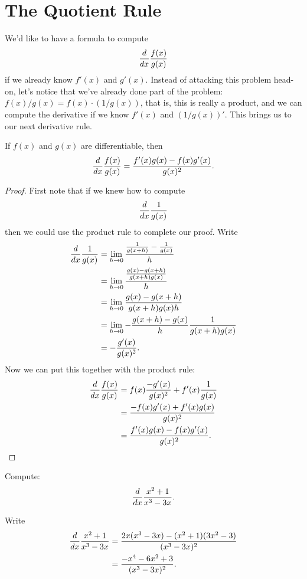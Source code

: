 \section{The Quotient Rule}


We'd like to have a formula to compute
\[
\frac{d}{dx} \frac{f(x)}{g(x)}
\]
if we already know $f'(x)$ and $g'(x)$. Instead of attacking this
problem head-on, let's notice that we've already done part of the
problem: $f(x)/g(x)= f(x)\cdot(1/g(x))$, that is, this is really a
product, and we can compute the derivative if we know $f'(x)$ and
$(1/g(x))'$. This brings us to our next derivative rule.

\begin{mainTheorem}\label{theorem:quotient-rule}
If $f(x)$ and $g(x)$ are differentiable, then
\[
\frac{d}{dx} \frac{f(x)}{g(x)} = \frac{f'(x)g(x)-f(x)g'(x)}{g(x)^2}.
\]
\end{mainTheorem}
\begin{proof}
First note that if we knew how to compute
\[
\frac{d}{dx} \frac{1}{g(x)}
\]
then we could use the product rule to complete our proof.  Write
\begin{align*}
\frac{d}{dx}\frac{1}{g(x)}&=\lim_{h\to0} \frac{\frac{1}{g(x+h)}-\frac{1}{g(x)}}{h} \\
&=\lim_{h\to0} \frac{\frac{g(x)-g(x+h)}{g(x+h)g(x)}}{h} \\
&=\lim_{h\to0} \frac{g(x)-g(x+h)}{g(x+h)g(x)h} \\
&=\lim_{h\to0} -\frac{g(x+h)-g(x)}{h} \frac{1}{g(x+h)g(x)} \\
&=-\frac{g'(x)}{g(x)^2}.
\end{align*}
Now we can put this together with the product rule:
\begin{align*}
\frac{d}{dx}\frac{f(x)}{g(x)} &=f(x)\frac{-g'(x)}{g(x)^2}+f'(x)\frac{1}{g(x)}\\
&=\frac{-f(x)g'(x)+f'(x)g(x)}{g(x)^2}\\
&=\frac{f'(x)g(x)-f(x)g'(x)}{g(x)^2}.
\end{align*}

\end{proof}


\begin{example}
Compute:
\[
\frac{d}{dx} \frac{x^2+1}{x^3-3x}.
\]
\end{example}

\begin{solution}
Write
\begin{align*}
\frac{d}{dx} \frac{x^2+1}{x^3-3x} &= \frac{2x(x^3-3x)-(x^2+1)(3x^2-3)}{(x^3-3x)^2}\\
&=\frac{-x^4-6x^2+3}{(x^3-3x)^2}.
\end{align*}
\end{solution}

